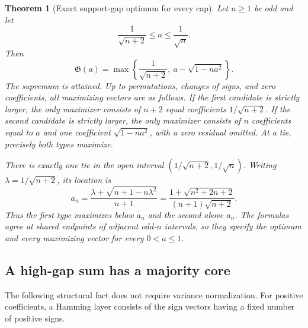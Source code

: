 \documentclass[11pt]{article}
\newtheorem{theorem}{Theorem}[section]
\theoremstyle{remark}\newtheorem{remark}[theorem]{Remark}
\begin{document}
\begin{theorem}[Exact support-gap optimum for every cap]\label{gap:main}
Let $n\ge1$ be odd and let
\[
 \frac1{\sqrt{n+2}}\le a\le\frac1{\sqrt n}.
\]
Then
\begin{equation}\label{gap:formula}
 \mathfrak G(a)=\max\left\{
 \frac1{\sqrt{n+2}},\ a-\sqrt{1-na^2}\right\}.
\end{equation}
The supremum is attained. Up to permutations, changes of signs, and
zero coefficients, all maximizing vectors are as follows.
If the first candidate is strictly larger, the only maximizer consists
of $n+2$ equal coefficients $1/\sqrt{n+2}$.
If the second candidate is strictly larger, the only maximizer consists
of $n$ coefficients equal to $a$ and one coefficient
$\sqrt{1-na^2}$, with a zero residual omitted.
At a tie, precisely both types maximize.

There is exactly one tie in the open interval
$(1/\sqrt{n+2},1/\sqrt n)$. Writing $\lambda=1/\sqrt{n+2}$,
its location is
\begin{equation}\label{gap:switch}
 a_n=\frac{\lambda+\sqrt{n+1-n\lambda^2}}{n+1}
     =\frac{1+\sqrt{n^2+2n+2}}{(n+1)\sqrt{n+2}}.
\end{equation}
Thus the first type maximizes below $a_n$ and the second above $a_n$.
The formulas agree at shared endpoints of adjacent odd-$n$ intervals,
so they specify the optimum and every maximizing vector for every
$0<a\le1$.
\end{theorem}

\subsection{A high-gap sum has a majority core}

The following structural fact does not require variance normalization.
For positive coefficients, a Hamming layer consists of the sign vectors
having a fixed number of positive signs.
\end{document}
